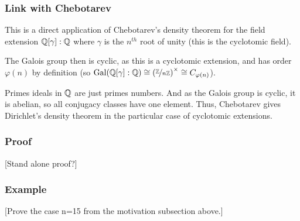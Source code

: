 \subsubsection{Link with Chebotarev}
This is a direct application of Chebotarev's density theorem for the field extension $\mathbb{Q}[\gamma]:\mathbb{Q}$ where $\gamma$ is the $n^{th}$ root of unity (this is the cyclotomic field).

The Galois group then is cyclic, as this is a cyclotomic extension, and has order $\varphi(n)$ by definition (so $\text{Gal}(\mathbb{Q}[\gamma]:\mathbb{Q}) \cong \left( \nicefrac{\mathbb{Z}}{n\mathbb{Z}} \right)^{\times} \cong C_{\varphi(n)}$).

Primes ideals in $\mathbb{Q}$ are just primes numbers. And as the Galois group is cyclic, it is abelian, so all conjugacy classes have one element.
Thus, Chebotarev gives Dirichlet's density theorem in the particular case of cyclotomic extensions.

\subsubsection{Proof}
[Stand alone proof?]

\subsubsection{Example}
[Prove the case n=15 from the motivation subsection above.]







